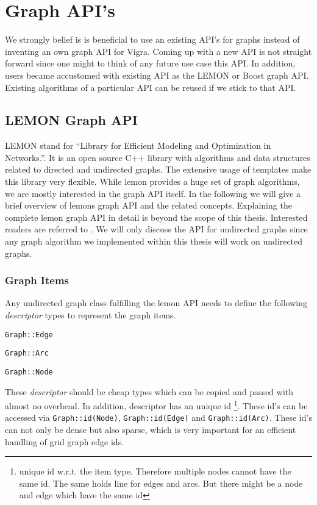 
\section{Graph API's}\label{sec:graph_apis}

We strongly belief is is beneficial to use an existing API's for
graphs instead of inventing an own graph API for Vigra.
Coming up with a new API is not straight forward
since one might to think of any future use case this API.
In addition, users became accustomed with existing API as 
the LEMON or Boost graph API.
Existing algorithms of a particular API can be reused if we stick
to that API.




\subsection{LEMON Graph API}\label{sec:lemon_graph_apis}
    LEMON \citet{ software_lemon} 
    stand for  ``Library for Efficient Modeling and Optimization in Networks.''.
    It is an open source C++ library with algorithms and data structures 
    related to directed and undirected graphs.
    The extensive usage of templates make this library very flexible.
    While lemon provides a huge set of graph algorithms,
    we are mostly interested in the graph API itself.
    In the following we will give a brief overview of lemons graph 
    API and the related concepts.
    Explaining the complete lemon graph API in detail
    is beyond the scope of this thesis.
    Interested readers are referred to \citet{software_lemon}.
    We will only discuss the API for undirected graphs since any
    graph algorithm we implemented within this thesis
    will work on undirected graphs.

\subsubsection{Graph Items}
    Any undirected graph class fulfilling the lemon API needs to define 
    the following \emph{descriptor} types to represent the graph items.
    \begin{compactitem}
    \item \lstinline{Graph::Edge}
    \item \lstinline{Graph::Arc}
    \item \lstinline{Graph::Node}
    \end{compactitem}
    These \emph{descriptor} should be cheap types which can be copied
    and passed with almost no overhead.
    In addition, descriptor has an unique id
    \footnote{ unique id w.r.t. the item type. 
    Therefore  multiple  nodes cannot have the same id.
    The same holds line for edges and arcs.
    But there might be a node and edge which have the same id}.
    These id's can be accessed via \lstinline{Graph::id(Node)}, \lstinline{Graph::id(Edge)} and \lstinline{Graph::id(Arc)}.
    These id's can not only be dense but also sparse, which is very
    important for an efficient handling of grid graph edge ids.



